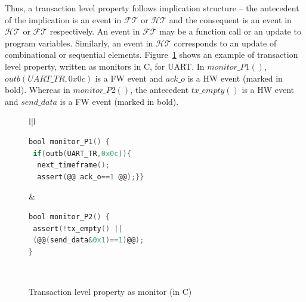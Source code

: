 \documentclass[sigconf]{acmart}
\begin{document}
Thus, a transaction level property follows implication structure -- the 
antecedent of the implication is an event in $\mathcal{FT}$ or 
$\mathcal{HT}$ and the consequent is an event in $\mathcal{HT}$ 
or $\mathcal{FT}$ respectively.  An event in $\mathcal{FT}$ may be 
a function call or an update to program variables. Similarly, an event in 
$\mathcal{HT}$ corresponds to an update of combinational or sequential 
elements. Figure~\ref{figure:transaction} shows an example of transaction 
level property, written as monitors in C, for UART.  In $monitor\_P1()$, 
$outb(UART\_TR,0x0c)$ is a FW event and $ack\_o$ is a HW event (marked in bold).  
Whereas in $monitor\_P2()$, the antecedent $tx\_empty()$ is a HW event and 
$send\_data$ is a FW event (marked in bold). 
%
\begin{figure}[htbp]
\scriptsize
\begin{tabular}{l|l}
\hline
{}
\\
\hline
\begin{lstlisting}[mathescape=true,language=C,moredelim={[is][keywordstyle]{@@}{@@}}]
bool monitor_P1() { 
 if(outb(UART_TR,0x0c)){
  next_timeframe();
  assert(@@ ack_o==1 @@);}}
\end{lstlisting} 
&
\begin{lstlisting}[mathescape=true,language=C,moredelim={[is][keywordstyle]{@@}{@@}}]
bool monitor_P2() { 
 assert(!tx_empty() || 
 (@@(send_data&0x1)==1)@@);
}
\end{lstlisting} \\ 
\hline
\end{tabular}
\caption{Transaction level property as monitor (in C)}
\label{figure:transaction}
\end{figure}
%

\end{document}
